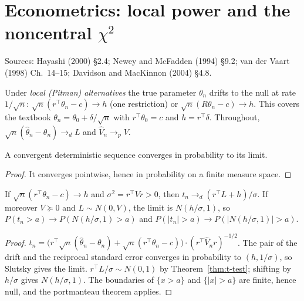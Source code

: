 \chapter{Econometrics: local power and the noncentral \texorpdfstring{$\chi^2$}{chi-squared}}
\label{chap:econometrics10}

Sources: Hayashi (2000) \S2.4; Newey and McFadden (1994) \S9.2; van der Vaart (1998) Ch.~14--15;
Davidson and MacKinnon (2004) \S4.8.

Under \emph{local (Pitman) alternatives} the true parameter $\theta_n$ drifts to the null at rate $1/\sqrt n$:
$\sqrt n(r^\top\theta_n - c)\to h$ (one restriction) or $\sqrt n(R\theta_n-c)\to h$. This covers the textbook
$\theta_n = \theta_0+\delta/\sqrt n$ with $r^\top\theta_0 = c$ and $h = r^\top\delta$. Throughout,
$\sqrt n(\hat\theta_n-\theta_n)\to_d L$ and $\hat V_n\to_p V$.

\begin{lemma}
\label{lem:det-in-measure}
\leanok
A convergent deterministic sequence converges in probability to its limit.
\end{lemma}
\begin{proof}
\leanok
It converges pointwise, hence in probability on a finite measure space.
\end{proof}

\begin{theorem}
\label{thm:t-local}
\leanok
{}
If $\sqrt n(r^\top\theta_n-c)\to h$ and $\sigma^2 = r^\top Vr > 0$, then $t_n\to_d (r^\top L+h)/\sigma$. If moreover
$V\succeq0$ and $L\sim N(0,V)$, the limit is $N(h/\sigma,1)$, so $P(t_n > a)\to P(N(h/\sigma,1) > a)$ and
$P(|t_n| > a)\to P(|N(h/\sigma,1)| > a)$.
\end{theorem}
\begin{proof}
\leanok
$t_n = \bigl(r^\top\sqrt n(\hat\theta_n-\theta_n) + \sqrt n(r^\top\theta_n-c)\bigr)\cdot(r^\top\hat V_nr)^{-1/2}$. The pair of the
drift and the reciprocal standard error converges in probability to $(h, 1/\sigma)$, so Slutsky gives the limit.
$r^\top L/\sigma\sim N(0,1)$ by Theorem~\ref{thm:t-test}; shifting by $h/\sigma$ gives $N(h/\sigma,1)$. The boundaries of
$\{x>a\}$ and $\{|x|>a\}$ are finite, hence null, and the portmanteau theorem applies.
\end{proof}

